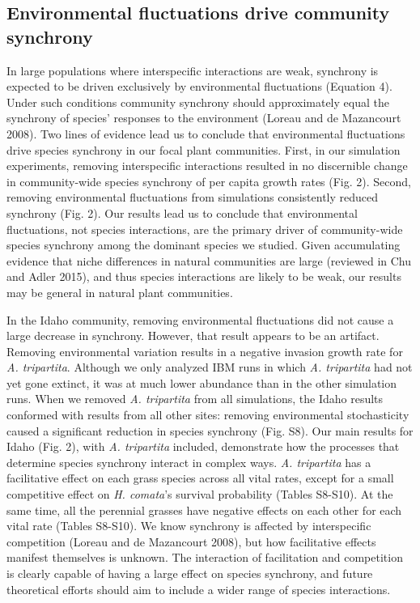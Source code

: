 \documentclass[12pt,]{article}
\begin{document}
\subsection{Environmental fluctuations drive community synchrony}

In large populations where interspecific interactions are weak,
synchrony is expected to be driven exclusively by environmental
fluctuations (Equation 4). Under such conditions community synchrony
should approximately equal the synchrony of species' responses to the
environment (Loreau and {{de Mazancourt}} 2008). Two lines of evidence
lead us to conclude that environmental fluctuations drive species
synchrony in our focal plant communities. First, in our simulation
experiments, removing interspecific interactions resulted in no
discernible change in community-wide species synchrony of per capita
growth rates (Fig. 2). Second, removing environmental fluctuations from
simulations consistently reduced synchrony (Fig. 2). Our results lead us
to conclude that environmental fluctuations, not species interactions,
are the primary driver of community-wide species synchrony
among the dominant species we studied. Given
accumulating evidence that niche differences in natural communities are
large (reviewed in Chu and Adler 2015), and thus species interactions
are likely to be weak, our results may be general in natural plant
communities.

In the Idaho community, removing environmental fluctuations did not
cause a large decrease in synchrony. However, that result appears to be
an artifact. Removing environmental variation results in a negative
invasion growth rate for \emph{A. tripartita}. Although we only analyzed
IBM runs in which \emph{A. tripartita} had not yet gone extinct, it was
at much lower abundance than in the other simulation runs. When we
removed \emph{A. tripartita} from all simulations, the Idaho results
conformed with results from all other sites: removing environmental
stochasticity caused a significant reduction in species synchrony (Fig.
S8). Our main results for Idaho (Fig. 2), with \emph{A. tripartita}
included, demonstrate how the processes that determine species synchrony
interact in complex ways. \emph{A. tripartita} has a facilitative effect
on each grass species across all vital rates, except for a small
competitive effect on \emph{H. comata}'s survival probability (Tables
S8-S10). At the same time, all the perennial grasses have negative
effects on each other for each vital rate (Tables S8-S10). We know
synchrony is affected by interspecific competition (Loreau and {{de
Mazancourt}} 2008), but how facilitative effects manifest themselves is
unknown. The interaction of facilitation and competition is clearly
capable of having a large effect on species synchrony, and future
theoretical efforts should aim to include a wider range of species
interactions.
\end{document}
